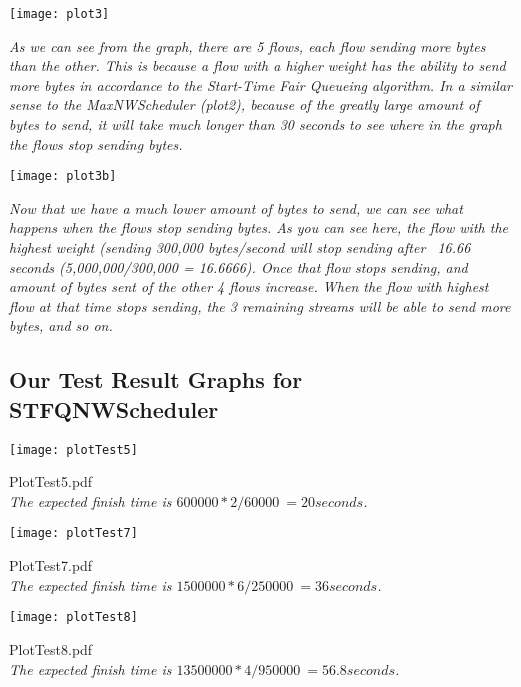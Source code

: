 \documentclass[11pt, letterpaper]{article}
\begin{document}
\centerline{\texttt{[image: plot3]}}

{\em As we can see from the graph, there are 5 flows, each flow sending more bytes than the other. This is because a flow with a higher weight has the ability 
to send more bytes in accordance to the Start-Time Fair Queueing algorithm. In a similar sense to the MaxNWScheduler (plot2), because of the greatly large amount of 
bytes to send, it will take much longer than 30 seconds to see where in the graph the flows stop sending bytes.}

\centerline{\texttt{[image: plot3b]}}

{\em Now that we have a much lower amount of bytes to send, we can see what happens when the flows stop sending bytes. As you can see here, the flow with the highest weight (sending 300,000 bytes/second
will stop sending after ~16.66 seconds (5,000,000/300,000 = 16.6666). Once that flow stops sending, and amount of bytes sent of the other 4 flows increase. When the flow with highest flow at that time stops
sending, the 3 remaining streams will be able to send more bytes, and so on.}

\subsection{Our Test Result Graphs for STFQNWScheduler}

\centerline{\texttt{[image: plotTest5]}}

{\centering PlotTest5.pdf\\}
{\em The expected finish time is $600000*2/60000 ~= 20 seconds$.
}

\centerline{\texttt{[image: plotTest7]}}

{\centering PlotTest7.pdf\\}
{\em The expected finish time is $1500000*6/250000 ~= 36 seconds$.
}

\centerline{\texttt{[image: plotTest8]}}

{\centering PlotTest8.pdf\\}
{\em The expected finish time is $13500000*4/950000 ~= 56.8 seconds$.
}
\end{document}

